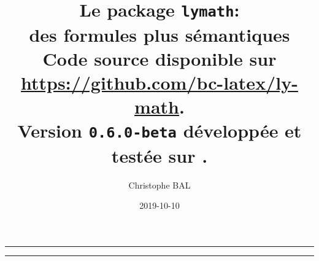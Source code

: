 \documentclass[12pt,a4paper]{article}
\begin{document}
\renewcommand\labelitemi{\raisebox{0.125em}{\tiny\textbullet}}
\renewcommand{\labelitemii}{---}

\title{%
	Le package \texttt{lymath}:\\%
	des formules plus sémantiques\\%
	{\footnotesize Code source disponible sur \url{https://github.com/bc-latex/ly-math}.}\\%
{\footnotesize Version \texttt{0.6.0-beta} développée et testée sur \macosxname{}.}%
}
\author{Christophe BAL}
\date{2019-10-10}

\maketitle


\vspace{2em}

\hrule

\tableofcontents

\vspace{1.5em}

\hrule

\newpage

\end{document}
